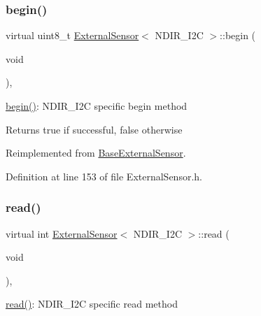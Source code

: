 \subsubsection{\texorpdfstring{begin()}{begin()}}
{\footnotesize\ttfamily virtual uint8\+\_\+t \hyperlink{class_external_sensor}{External\+Sensor}$<$ N\+D\+I\+R\+\_\+\+I2C $>$\+::begin (\begin{DoxyParamCaption}\item[{void}]{ }\end{DoxyParamCaption})\hspace{0.3cm}{\ttfamily [inline]}, {\ttfamily [virtual]}}

\hyperlink{class_external_sensor_3_01_n_d_i_r___i2_c_01_4_ac6f3614d94968ef0cc11b2b4d69cef03}{begin()}\+: N\+D\+I\+R\+\_\+\+I2C specific begin method

\begin{DoxyReturn}{Returns}
true if successful, false otherwise 
\end{DoxyReturn}


Reimplemented from \hyperlink{class_base_external_sensor_a87d132803d4f4fdd4e66332809f0c9a0}{Base\+External\+Sensor}.



Definition at line 153 of file External\+Sensor.\+h.

\mbox{\label{class_external_sensor_3_01_n_d_i_r___i2_c_01_4_add67f5ecaf47d2ee675e8299aee7322d}} 
\subsubsection{\texorpdfstring{read()}{read()}}
{\footnotesize\ttfamily virtual int \hyperlink{class_external_sensor}{External\+Sensor}$<$ N\+D\+I\+R\+\_\+\+I2C $>$\+::read (\begin{DoxyParamCaption}\item[{void}]{ }\end{DoxyParamCaption})\hspace{0.3cm}{\ttfamily [inline]}, {\ttfamily [virtual]}}

\hyperlink{class_external_sensor_3_01_n_d_i_r___i2_c_01_4_add67f5ecaf47d2ee675e8299aee7322d}{read()}\+: N\+D\+I\+R\+\_\+\+I2C specific read method

